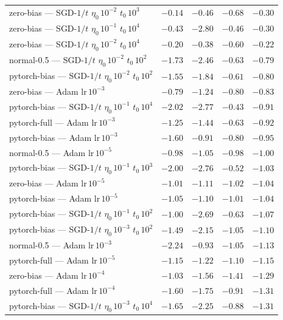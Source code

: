 \begin{table}[H]
\begin{tabular}{@{}>{\raggedright\arraybackslash}p{5.2cm} cccc@{}}
zero-bias --- SGD-$1/t$ $\eta_0\,10^{-2}$ $t_0\,10^{3}$ & $-0.14$ & \underline{$-0.46$} & $-0.68$ & $-0.30$ \\
zero-bias --- SGD-$1/t$ $\eta_0\,10^{-1}$ $t_0\,10^{4}$ & $-0.43$ & $-2.80$ & $-0.46$ & $-0.30$ \\
zero-bias --- SGD-$1/t$ $\eta_0\,10^{-2}$ $t_0\,10^{4}$ & $-0.20$ & $-0.38$ & $-0.60$ & $-0.22$ \\
normal-0.5 --- SGD-$1/t$ $\eta_0\,10^{-2}$ $t_0\,10^{2}$ & $-1.73$ & $-2.46$ & $-0.63$ & $-0.79$ \\
pytorch-bias --- SGD-$1/t$ $\eta_0\,10^{-2}$ $t_0\,10^{2}$ & $-1.55$ & $-1.84$ & $-0.61$ & $-0.80$ \\
zero-bias --- Adam $\mathrm{lr}\,10^{-3}$ & $-0.79$ & $-1.24$ & $-0.80$ & $-0.83$ \\
pytorch-bias --- SGD-$1/t$ $\eta_0\,10^{-1}$ $t_0\,10^{4}$ & $-2.02$ & $-2.77$ & $-0.43$ & $-0.91$ \\
pytorch-full --- Adam $\mathrm{lr}\,10^{-3}$ & $-1.25$ & $-1.44$ & $-0.63$ & $-0.92$ \\
pytorch-bias --- Adam $\mathrm{lr}\,10^{-3}$ & $-1.60$ & $-0.91$ & $-0.80$ & $-0.95$ \\
normal-0.5 --- Adam $\mathrm{lr}\,10^{-5}$ & $-0.98$ & $-1.05$ & $-0.98$ & $-1.00$ \\
pytorch-bias --- SGD-$1/t$ $\eta_0\,10^{-1}$ $t_0\,10^{3}$ & $-2.00$ & $-2.76$ & $-0.52$ & $-1.03$ \\
zero-bias --- Adam $\mathrm{lr}\,10^{-5}$ & $-1.01$ & $-1.11$ & $-1.02$ & $-1.04$ \\
pytorch-bias --- Adam $\mathrm{lr}\,10^{-5}$ & $-1.05$ & $-1.10$ & $-1.01$ & $-1.04$ \\
pytorch-bias --- SGD-$1/t$ $\eta_0\,10^{-1}$ $t_0\,10^{2}$ & $-1.00$ & $-2.69$ & $-0.63$ & $-1.07$ \\
pytorch-bias --- SGD-$1/t$ $\eta_0\,10^{-3}$ $t_0\,10^{2}$ & $-1.49$ & $-2.15$ & $-1.05$ & $-1.10$ \\
normal-0.5 --- Adam $\mathrm{lr}\,10^{-3}$ & $-2.24$ & $-0.93$ & $-1.05$ & $-1.13$ \\
pytorch-full --- Adam $\mathrm{lr}\,10^{-5}$ & $-1.15$ & $-1.22$ & $-1.10$ & $-1.15$ \\
zero-bias --- Adam $\mathrm{lr}\,10^{-4}$ & $-1.03$ & $-1.56$ & $-1.41$ & $-1.29$ \\
pytorch-full --- Adam $\mathrm{lr}\,10^{-4}$ & $-1.60$ & $-1.75$ & $-0.91$ & $-1.31$ \\
pytorch-bias --- SGD-$1/t$ $\eta_0\,10^{-3}$ $t_0\,10^{4}$ & $-1.65$ & $-2.25$ & $-0.88$ & $-1.31$ \\

\end{tabular}
\end{table}
